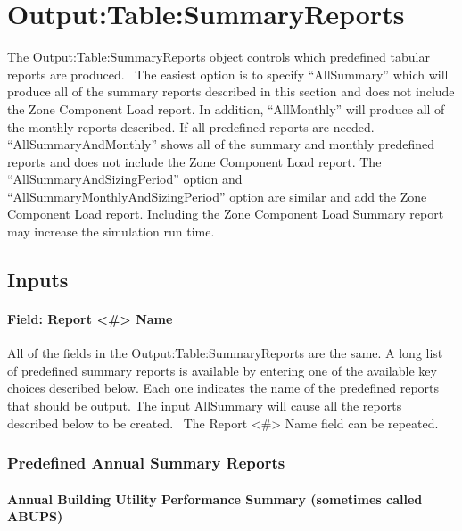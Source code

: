 \section{Output:Table:SummaryReports}\label{outputtablesummaryreports}

The Output:Table:SummaryReports object controls which predefined tabular reports are produced.~ The easiest option is to specify ``AllSummary'' which will produce all of the summary reports described in this section and does not include the Zone Component Load report. In addition, ``AllMonthly'' will produce all of the monthly reports described. If all predefined reports are needed. ``AllSummaryAndMonthly'' shows all of the summary and monthly predefined reports and does not include the Zone Component Load report. The ``AllSummaryAndSizingPeriod'' option and ``AllSummaryMonthlyAndSizingPeriod'' option are similar and add the Zone Component Load report. Including the Zone Component Load Summary report may increase the simulation run time.

\subsection{Inputs}\label{inputs-064}

\paragraph{Field: Report \textless{}\#\textgreater{} Name}\label{field-report-name}

All of the fields in the Output:Table:SummaryReports are the same. A long list of predefined summary reports is available by entering one of the available key choices described below. Each one indicates the name of the predefined reports that should be output. The input AllSummary will cause all the reports described below to be created.~ The Report \textless{}\#\textgreater{} Name field can be repeated.

\subsubsection{Predefined Annual Summary Reports}\label{predefined-annual-summary-reports}

\paragraph{Annual Building Utility Performance Summary (sometimes called ABUPS)}\label{annual-building-utility-performance-summary-sometimes-called-abups}

